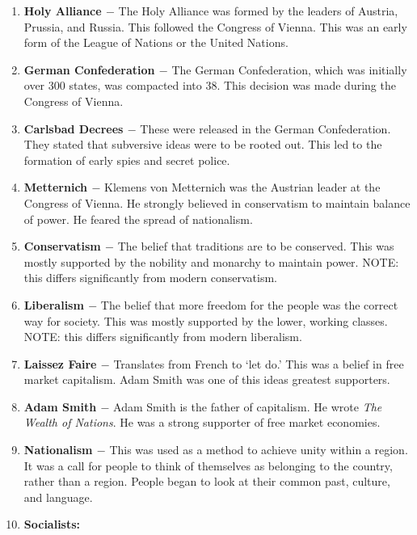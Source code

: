 \documentclass[12pt]{article}
\begin{document}
\begin{enumerate}
\item \textbf{Holy Alliance $-$} The Holy Alliance was formed by the leaders of Austria, Prussia, and Russia. This followed the Congress of Vienna. This was an early form of the League of Nations or the United Nations.

\item \textbf{German Confederation $-$} The German Confederation, which was initially over 300 states, was compacted into 38. This decision was made during the Congress of Vienna.

\item \textbf{Carlsbad Decrees $-$} These were released in the German Confederation. They stated that subversive ideas were to be rooted out. This led to the formation of early spies and secret police.

\item \textbf{Metternich $-$} Klemens von Metternich was the Austrian leader at the Congress of Vienna. He strongly believed in conservatism to maintain balance of power. He feared the spread of nationalism.

\item \textbf{Conservatism $-$} The belief that traditions are to be conserved. This was mostly supported by the nobility and monarchy to maintain power. NOTE: this differs significantly from modern conservatism.

\item \textbf{Liberalism $-$} The belief that more freedom for the people was the correct way for society. This was mostly supported by the lower, working classes. NOTE: this differs significantly from modern liberalism.

\item \textbf{Laissez Faire $-$} Translates from French to `let do.' This was a belief in free market capitalism. Adam Smith was one of this ideas greatest supporters.

\item \textbf{Adam Smith $-$} Adam Smith is the father of capitalism. He wrote \textit{The Wealth of Nations}. He was a strong supporter of free market economies.

\item \textbf{Nationalism $-$} This was used as a method to achieve unity within a region. It was a call for people to think of themselves as belonging to the country, rather than a region. People began to look at their common past, culture, and language.

\item \textbf{Socialists:}


\end{enumerate}
\end{document}
